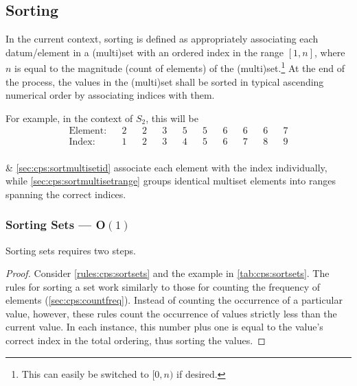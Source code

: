 \subsection{Sorting}\label{sec:cps:sorting}

In the current context, sorting is defined as appropriately associating each datum/element in a (multi)set with an ordered index in the range \([1,n]\), where \(n\) is equal to the magnitude (count of elements) of the (multi)set.\footnote{This can easily be switched to \([0,n)\) if desired.}  At the end of the process, the values in the (multi)set shall be sorted in typical ascending numerical order by associating indices with them.

For example, in the context of \(S_2\), this will be 
\begin{align*}
    \text{Element:}& &2 &&2 &&3 &&5 &&5 &&6 &&6 &&6 &&7\\
    \text{Index:}&   &1 &&2 &&3 &&4 &&5 &&6 &&7 &&8 &&9\\
\end{align*}

 \& \cref{sec:cps:sortmultisetid} associate each element with the index individually, while \cref{sec:cps:sortmultisetrange} groups identical multiset elements into ranges spanning the correct indices.

\subsubsection{Sorting Sets --- O\((1)\)}  \label{sec:cps:sortsets}

\begin{proposition}\label{prop:cps:sortsets}
Sorting sets requires two steps.
\end{proposition}

\begin{proof}
Consider \cref{rules:cps:sortsets} and the example in \cref{tab:cps:sortsets}.  The rules for sorting a set work similarly to those for counting the frequency of elements (\cref{sec:cps:countfreq}).  Instead of counting the occurrence of a particular value, however, these rules count the occurrence of values strictly less than the current value.  In each instance, this number plus one is equal to the value's correct index in the total ordering, thus sorting the values.
\end{proof}

